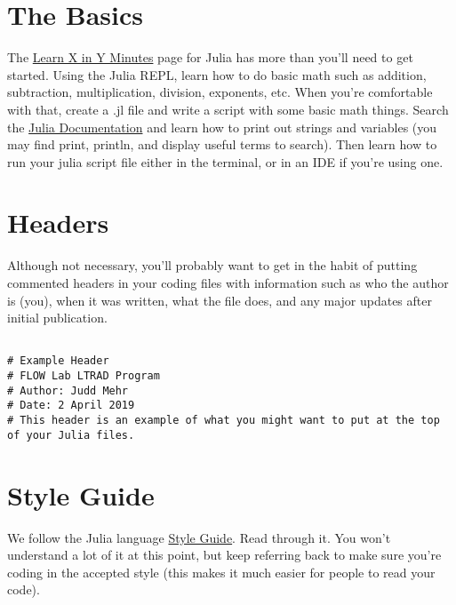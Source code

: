 \documentclass{article}%
\begin{document}
\section*{The Basics}
The \href{https://learnxinyminutes.com/docs/julia/}{Learn X in Y Minutes} page for Julia has more than you'll need to get started.  Using the Julia REPL, learn how to do basic math such as addition, subtraction, multiplication, division, exponents, etc.  When you're comfortable with that, create a .jl file and write a script with some basic math things. Search the \href{https://docs.julialang.org/en/v1/index.html}{Julia Documentation} and learn how to print out strings and variables (you may find print, println, and display useful terms to search). Then learn how to run your julia script file either in the terminal, or in an IDE if you're using one.


\section*{Headers}
Although not necessary, you'll probably want to get in the habit of putting commented headers in your coding files with information such as who the author is (you), when it was written, what the file does, and any major updates after initial publication.

\begin{lstlisting}[frame=single]

# Example Header
# FLOW Lab LTRAD Program
# Author: Judd Mehr
# Date: 2 April 2019
# This header is an example of what you might want to put at the top of your Julia files.
\end{lstlisting}


\section*{Style Guide}
We follow the Julia language \href{https://docs.julialang.org/en/v1/manual/style-guide/index.html}{Style Guide}. Read through it. You won't understand a lot of it at this point, but keep referring back to make sure you're coding in the accepted style (this makes it much easier for people to read your code).
\end{document}
